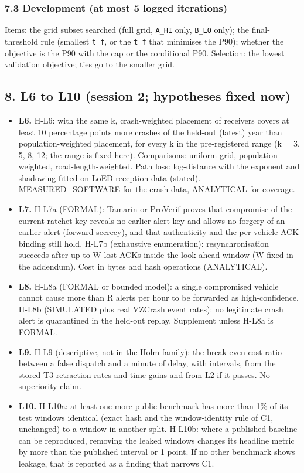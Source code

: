 \subsubsection*{7.3 Development (at most 5 logged iterations)}

Items: the grid subset searched (full grid, \texttt{A\_HI} only, \texttt{B\_LO} only); the final-threshold rule (smallest \texttt{t\_f}, or the \texttt{t\_f} that minimises the P90); whether the objective is the P90 with the cap or the conditional P90. Selection: the lowest validation objective; ties go to the smaller grid.

\subsection*{8. L6 to L10 (session 2; hypotheses fixed now)}

\begin{itemize}
\item \textbf{L6.} H-L6: with the same k, crash-weighted placement of receivers covers at least 10 percentage points more crashes of the held-out (latest) year than population-weighted placement, for every k in the pre-registered range (k = 3, 5, 8, 12; the range is fixed here). Comparisons: uniform grid, population-weighted, road-length-weighted. Path loss: log-distance with the exponent and shadowing fitted on LoED reception data (stated). MEASURED\_SOFTWARE for the crash data, ANALYTICAL for coverage.
\item \textbf{L7.} H-L7a (FORMAL): Tamarin or ProVerif proves that compromise of the current ratchet key reveals no earlier alert key and allows no forgery of an earlier alert (forward secrecy), and that authenticity and the per-vehicle ACK binding still hold. H-L7b (exhaustive enumeration): resynchronisation succeeds after up to W lost ACKs inside the look-ahead window (W fixed in the addendum). Cost in bytes and hash operations (ANALYTICAL).
\item \textbf{L8.} H-L8a (FORMAL or bounded model): a single compromised vehicle cannot cause more than R alerts per hour to be forwarded as high-confidence. H-L8b (SIMULATED plus real VZCrash event rates): no legitimate crash alert is quarantined in the held-out replay. Supplement unless H-L8a is FORMAL.
\item \textbf{L9.} H-L9 (descriptive, not in the Holm family): the break-even cost ratio between a false dispatch and a minute of delay, with intervals, from the stored T3 retraction rates and time gains and from L2 if it passes. No superiority claim.
\item \textbf{L10.} H-L10a: at least one more public benchmark has more than 1\% of its test windows identical (exact hash and the window-identity rule of C1, unchanged) to a window in another split. H-L10b: where a published baseline can be reproduced, removing the leaked windows changes its headline metric by more than the published interval or 1 point. If no other benchmark shows leakage, that is reported as a finding that narrows C1.
\end{itemize}

